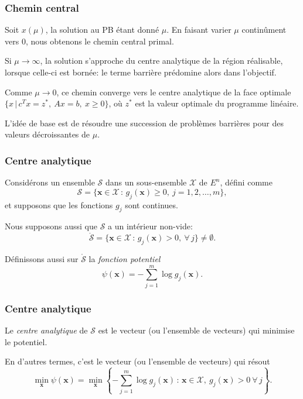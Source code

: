 \documentclass[usepdftitle=false, aspectratio=169]{beamer}
\def\bx{\boldsymbol{x}}
\begin{document}
\begin{frame}
\frametitle{Chemin central}

Soit $x(\mu)$, la solution au PB étant donné $\mu$.
En faisant varier $\mu$ continûment vers 0, nous obtenons le chemin central primal.

\mbox{}

Si $\mu \rightarrow \infty$, la solution s'approche du centre analytique de la région réalisable, lorsque celle-ci est bornée: le terme barrière prédomine alors dans l'objectif.

\mbox{}

Comme $\mu \rightarrow 0$, ce chemin converge vers le centre analytique de la face optimale $\lbrace x \,|\, c^Tx = z^*,\ Ax = b,\ x \geq 0 \rbrace$, où $z^*$ est la valeur optimale du programme linéaire.

\mbox{}

L'idée de base est de résoudre une succession de problèmes barrières pour des valeurs décroissantes de $\mu$.

\end{frame}

\begin{frame}
\frametitle{Centre analytique}

Considérons un ensemble $\mathcal{S}$ dans un sous-ensemble $\mathcal{X}$ de $E^n$, défini comme
\[
\mathcal{S} = \lbrace \bx \in \mathcal{X}\,:\, g_j(\bx) \geq 0,\ j = 1,2,\ldots,m \rbrace,
\]
et supposons que les fonctions $g_j$ sont continues.

\mbox{}

Nous supposons aussi que $\mathcal{S}$ a un intérieur non-vide:
\[
\mathring{\mathcal{S}} = \lbrace \bx \in \mathcal{X} \,:\, g_j(\bx) > 0,\ \forall\, j \rbrace \ne \emptyset.
\]

\mbox{}

Définissons aussi sur $\mathring{\mathcal{S}}$ la {\em fonction potentiel}
\[
\psi(\bx) = -\sum_{j = 1}^m \log g_j(\bx).
\]

\end{frame}

\begin{frame}
\frametitle{Centre analytique}

Le {\em centre analytique} de $\mathcal{S}$ est le vecteur (ou l'ensemble de vecteurs) qui minimise le potentiel.

\mbox{}

En d'autres termes, c'est le vecteur (ou l'ensemble de vecteurs) qui résout
\[
\min_{\bx} \psi(\bx) =
\min_{\bx}
\left\lbrace
-\sum_{j = 1}^m \log g_j(\bx) \,:\, \bx \in \mathcal{X},\ g_j(\bx) > 0\ \forall\, j
\right\rbrace.
\]

\end{frame}
\end{document}
